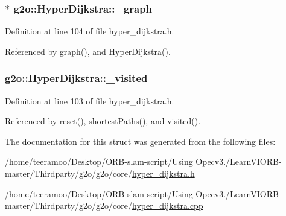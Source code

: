 \subsubsection[{\texorpdfstring{\+\_\+graph}{_graph}}]{$\ast$ g2o\+::\+Hyper\+Dijkstra\+::\+\_\+graph\hspace{0.3cm}{\ttfamily [protected]}}\hypertarget{structg2o_1_1HyperDijkstra_a1bf21d65ddd6e0feeb6a76f58d7f2c6e}{}\label{structg2o_1_1HyperDijkstra_a1bf21d65ddd6e0feeb6a76f58d7f2c6e}


Definition at line 104 of file hyper\+\_\+dijkstra.\+h.



Referenced by graph(), and Hyper\+Dijkstra().

\subsubsection[{\texorpdfstring{\+\_\+visited}{_visited}}]{ g2o\+::\+Hyper\+Dijkstra\+::\+\_\+visited\hspace{0.3cm}{\ttfamily [protected]}}\hypertarget{structg2o_1_1HyperDijkstra_ad43cae6d9e1df2cf7db839f504ba6cc5}{}\label{structg2o_1_1HyperDijkstra_ad43cae6d9e1df2cf7db839f504ba6cc5}


Definition at line 103 of file hyper\+\_\+dijkstra.\+h.



Referenced by reset(), shortest\+Paths(), and visited().



The documentation for this struct was generated from the following files\+:\begin{DoxyCompactItemize}
\item 
/home/teeramoo/\+Desktop/\+O\+R\+B-\/slam-\/script/\+Using Opecv3./\+Learn\+V\+I\+O\+R\+B-\/master/\+Thirdparty/g2o/g2o/core/\hyperlink{hyper__dijkstra_8h}{hyper\+\_\+dijkstra.\+h}\item 
/home/teeramoo/\+Desktop/\+O\+R\+B-\/slam-\/script/\+Using Opecv3./\+Learn\+V\+I\+O\+R\+B-\/master/\+Thirdparty/g2o/g2o/core/\hyperlink{hyper__dijkstra_8cpp}{hyper\+\_\+dijkstra.\+cpp}\end{DoxyCompactItemize}
